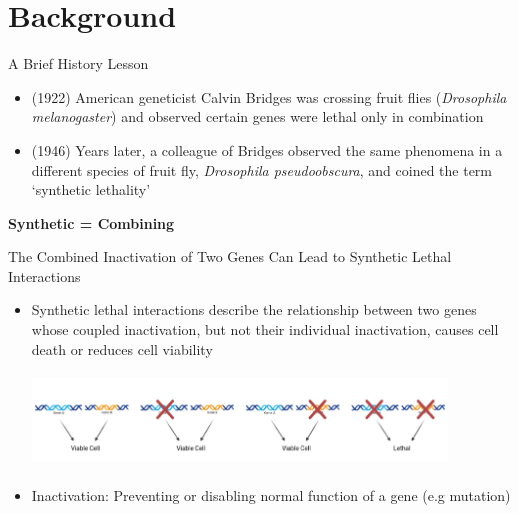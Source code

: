 \documentclass{beamer}
\begin{document}
	\section{Background}
	\begin{frame}{A Brief History Lesson}
		\begin{itemize}
			\item (1922) American geneticist Calvin Bridges was crossing fruit flies (\textit{Drosophila melanogaster}) and observed certain genes were lethal only in combination \newline
			\item (1946) Years later, a colleague of Bridges observed the same phenomena in a different species of fruit fly, \textit{Drosophila pseudoobscura}, and coined the term `synthetic lethality' \newline
		\end{itemize}
		
		\centering
		\huge \textbf{Synthetic = Combining}
		
		
	\end{frame}
	
	\begin{frame}{The Combined Inactivation of Two Genes Can Lead to Synthetic Lethal Interactions}
		\label{link1}
		
		\begin{itemize}
			\item Synthetic lethal interactions describe the relationship between two genes whose coupled inactivation, but not their individual inactivation, causes cell death or reduces cell viability \newline
				
			\includegraphics[width=11cm, height=2.5cm]{slbasic.png} 
		
			\item Inactivation: Preventing or disabling normal function of a gene (e.g mutation)
		\end{itemize}
		
	\end{frame}
\end{document}
